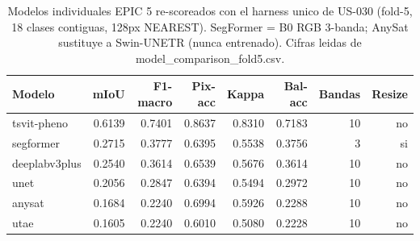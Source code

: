 \begin{table}
\caption{Modelos individuales EPIC 5 re-scoreados con el harness unico de US-030 (fold-5, 18 clases contiguas, 128px NEAREST). SegFormer = B0 RGB 3-banda; AnySat sustituye a Swin-UNETR (nunca entrenado). Cifras leidas de model\_comparison\_fold5.csv.}
\label{tab:segmentation_individual_fold5}
\begin{tabular}{lrrrrrrr}
\toprule
Modelo & mIoU & F1-macro & Pix-acc & Kappa & Bal-acc & Bandas & Resize \\
\midrule
tsvit-pheno & 0.6139 & 0.7401 & 0.8637 & 0.8310 & 0.7183 & 10 & no \\
segformer & 0.2715 & 0.3777 & 0.6395 & 0.5538 & 0.3756 & 3 & si \\
deeplabv3plus & 0.2540 & 0.3614 & 0.6539 & 0.5676 & 0.3614 & 10 & no \\
unet & 0.2056 & 0.2847 & 0.6394 & 0.5494 & 0.2972 & 10 & no \\
anysat & 0.1684 & 0.2240 & 0.6994 & 0.5926 & 0.2288 & 10 & no \\
utae & 0.1605 & 0.2240 & 0.6010 & 0.5080 & 0.2228 & 10 & no \\
\bottomrule
\end{tabular}
\end{table}
